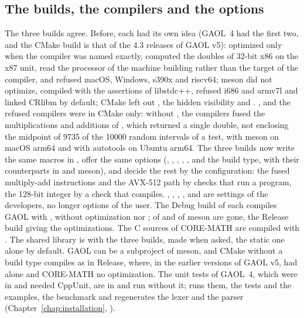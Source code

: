 \subsection{The builds, the compilers and the options}
\label{sec:changes-builds}
%

The three builds agree.\newinvfive{} Before, each had its own idea (GAOL~4 had the first two, and the CMake build
is that of the 4.3 releases of GAOL v5):
 optimized only when the compiler was named 
exactly, computed the doubles of 32-bit x86 on the x87 unit, read the
processor of the machine building rather than the target of the compiler, and
refused macOS, Windows, s390x and riscv64; meson did not optimize, compiled
with the assertions of libstdc++, refused i686 and armv7l and linked CRlibm
by default; CMake left out , the hidden visibility and
. , 
and the refused compilers were in CMake only: without
, the compilers fused the multiplications and
additions of , which returned a single double, not enclosing the
midpoint of 9735 of the 10000 random intervals of a test, with meson on
macOS arm64 and with autotools on Ubuntu arm64. The three builds now write
the same macros in , offer the same options
(, , ,
, ,  and
the build type, with their counterparts in  and meson), and
decide the rest by the configuration: the fused multiply-add instructions and
the AVX-512 path by checks that run a program, the 128-bit integer by a check
that compiles. , ,
, ,  and
 are settings of the developers, no longer options
of the user. The Debug build of each compiles GAOL with , without
optimization nor ;  of
 and  of meson are gone, the Release build giving the
optimizations. The C sources of CORE-MATH are compiled with
. The shared library is  with the
three builds, made when asked, the static one alone by default. GAOL can be a
subproject of meson, and CMake without a build type compiles as in Release,
where, in the earlier versions of GAOL v5,  had 
alone and CORE-MATH no optimization.
The unit tests of GAOL~4, which were in  and needed CppUnit,
are in  and run without it;  runs them,
 the tests and the examples,  the benchmark
and  regenerates the lexer and the parser
(Chapter~\ref{chap:installation}, ).

